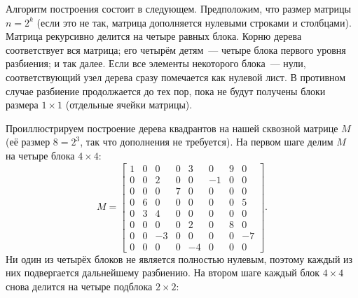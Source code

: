 Алгоритм построения состоит в следующем.
Предположим, что размер матрицы $n = 2^k$ (если это не так, матрица дополняется нулевыми строками и столбцами).
Матрица рекурсивно делится на четыре равных блока.
Корню дерева соответствует вся матрица; его четырём детям~--- четыре блока первого уровня разбиения; и так далее.
Если все элементы некоторого блока~--- нули, соответствующий узел дерева сразу помечается как нулевой лист.
В противном случае разбиение продолжается до тех пор, пока не будут получены блоки размера $1 \times 1$ (отдельные ячейки матрицы).

Проиллюстрируем построение дерева квадрантов на нашей сквозной матрице $M$ (её размер $8 = 2^3$, так что дополнения не требуется).
На первом шаге делим $M$ на четыре блока $4 \times 4$:
\[
    M=
    \left[
        \begin{array}{cccc|cccc}
            1 & 0 & 0 & 0 & 3 & 0 & 9 & 0 \\
            0 & 0 & 2 & 0 & 0 & -1 & 0 & 0 \\
            0 & 0 & 0 & 7 & 0 & 0 & 0 & 0 \\
            0 & 6 & 0 & 0 & 0 & 0 & 0 & 5 \\
            \hline
            0 & 3 & 4 & 0 & 0 & 0 & 0 & 0 \\
            0 & 0 & 0 & 0 & 2 & 0 & 8 & 0 \\
            0 & 0 & -3 & 0 & 0 & 0 & 0 & -7 \\
            0 & 0 & 0 & 0 & -4 & 0 & 0 & 0
        \end{array}
    \right].
\]
Ни один из четырёх блоков не является полностью нулевым, поэтому каждый из них подвергается дальнейшему разбиению.
На втором шаге каждый блок $4 \times 4$ снова делится на четыре подблока $2 \times 2$:
